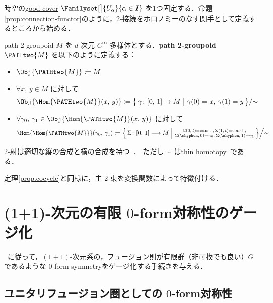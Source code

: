 \documentclass[TQFT_main]{subfiles}
\begin{document}
時空の\hyperref[def:good-cover]{good cover} $\Familyset[\big]{U_\alpha}{\alpha \in I}$ を1つ固定する．命題\ref{prop:connection-functor}のように，2-接続をホロノミーのなす関手として定義するところから始める．

\begin{mydef}[label=def:path2grpd]{path 2-groupoid}
    $M$ を $d$ 次元 $C^\infty$ 多様体とする．\textbf{path 2-groupoid} $\PATHtwo{M}$ を以下のように定義する：
    \begin{itemize}
        \item $\Obj{\PATHtwo{M}} \coloneqq M$
        \item $\forall x,\, y \in M$ に対して
        \begin{align}
            \Obj{\Hom{\PATHtwo{M}}(x,\, y)} \coloneqq \bigl\{\, \gamma \colon [0,\, 1] \to M \bigm| \gamma(0) = x,\, \gamma(1) = y \,\bigr\} /{\sim}
        \end{align}
        \item $\forall \gamma_0,\, \gamma_1 \in \Obj{\Hom{\PATHtwo{M}}(x,\, y)}$ に対して
        \begin{align}
            \Hom{\Hom{\PATHtwo{M}}} (\gamma_0,\, \gamma_1) \coloneqq \Bigl\{\, \Sigma \colon [0,\, 1] \lto M \Bigm| \substack{\Sigma(0,\, t) = \mathrm{const.},\, \Sigma(1,\, t) = \mathrm{const.}, \\ \Sigma (\mhyphen,\, 0) = \gamma_0,\, \Sigma (\mhyphen,\, 1) = \gamma_1 }\,\Bigr\} \Big{/} {\sim}
        \end{align}
    \end{itemize}
    2-射は適切な縦の合成と横の合成を持つ~\cite[Definition20, p.20]{BaezSchreiber2004HGT1}．
    ただし $\sim$ はthin homotopy~\cite[Definition19, p.20]{BaezSchreiber2004HGT1}である．
\end{mydef}

定理\ref{prop.cocycle}と同様に，主 $2$-束を変換関数によって特徴付ける．

\section{(1+1)-次元の有限 $0$-form対称性のゲージ化}

~\cite{BhardwajTachikawa2017gauging2d}に従って，$(1+1)$-次元系の，フュージョン則が有限群（非可換でも良い）$G$ であるような $0$-form symmetryをゲージ化する手続きを与える．

\subsection{ユニタリフュージョン圏としての $0$-form対称性}
\end{document}

